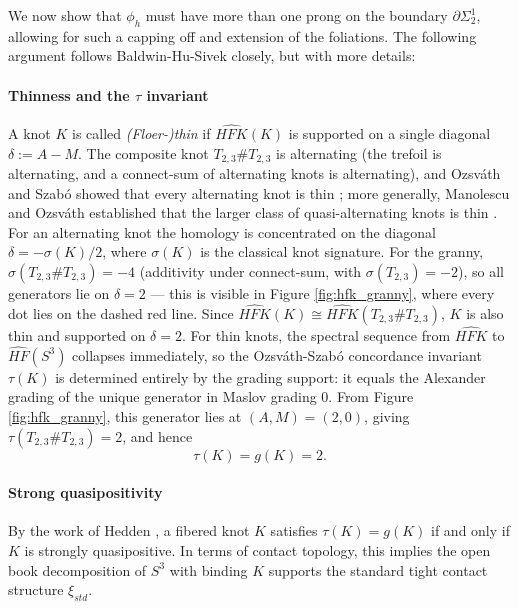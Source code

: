 We now show that $\phi_h$ must have more than one prong on the boundary $\partial \Sigma_2^1$, allowing for such a capping off and extension of the foliations. The following argument follows Baldwin-Hu-Sivek closely, but with more details:

\paragraph{Thinness and the $\tau$ invariant} A knot $K$ is called \emph{(Floer-)thin} if $\widehat{HFK}(K)$ is supported on a single diagonal $\delta := A - M$. The composite knot $T_{2,3} \# T_{2,3}$ is alternating (the trefoil is alternating, and a connect-sum of alternating knots is alternating), and Ozsv\'{a}th and Szab\'{o} showed that every alternating knot is thin \cite{ozsvath2003heegaard}; more generally, Manolescu and Ozsv\'{a}th established that the larger class of quasi-alternating knots is thin \cite{ManolescuOzsvath2008}. For an alternating knot the homology is concentrated on the diagonal $\delta = -\sigma(K)/2$, where $\sigma(K)$ is the classical knot signature. For the granny, $\sigma(T_{2,3}\#T_{2,3}) = -4$ (additivity under connect-sum, with $\sigma(T_{2,3}) = -2$), so all generators lie on $\delta = 2$ --- this is visible in Figure \ref{fig:hfk_granny}, where every dot lies on the dashed red line. Since $\widehat{HFK}(K) \cong \widehat{HFK}(T_{2,3} \# T_{2,3})$, $K$ is also thin and supported on $\delta = 2$. For thin knots, the spectral sequence from $\widehat{HFK}$ to $\widehat{HF}(S^3)$ collapses immediately, so the Ozsv\'{a}th-Szab\'{o} concordance invariant $\tau(K)$ is determined entirely by the grading support: it equals the Alexander grading of the unique generator in Maslov grading $0$. From Figure \ref{fig:hfk_granny}, this generator lies at $(A, M) = (2, 0)$, giving $\tau(T_{2,3} \# T_{2,3}) = 2$, and hence
\[
\tau(K) = g(K) = 2.
\]

\paragraph{Strong quasipositivity} By the work of Hedden \cite{Hedden2010}, a fibered knot $K$ satisfies $\tau(K) = g(K)$ if and only if $K$ is strongly quasipositive. In terms of contact topology, this implies the open book decomposition of $S^3$ with binding $K$ supports the standard tight contact structure $\xi_{std}$.

